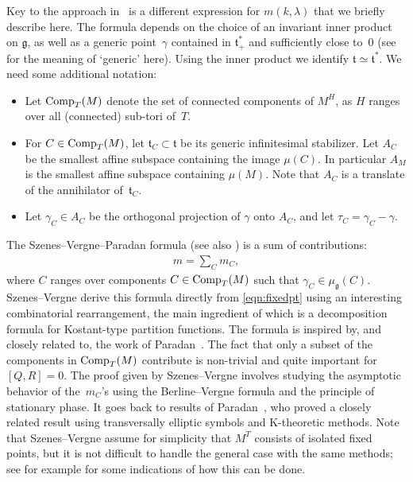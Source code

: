 \documentclass[11pt]{article}
\numberwithin{equation}{section}
\newcommand{\tn}[1]{\textnormal{#1}}
\def\g{\ensuremath{\mathfrak{g}}}
\def\t{\ensuremath{\mathfrak{t}}}
\begin{document}
Key to the approach in~\cite{SzenesVergne2010} is a different expression for $m(k,\lambda)$ that we briefly describe here. The formula depends on the choice of an invariant inner product on $\g$, as well as a generic point~$\gamma$ contained in $\t^\ast_+$ and sufficiently close to~$0$ (see~\cite[Section~4.1]{SzenesVergne2010} for the meaning of `generic' here). Using the inner product we identify $\t \simeq \t^\ast$. We need some additional notation:
\begin{itemize}\itemsep=0pt
\item Let $\tn{Comp}_T(M)$ denote the set of connected components of $M^H$, as $H$ ranges over all (connected) sub-tori of~$T$.
\item For $C \in \tn{Comp}_T(M)$, let $\t_C \subset \t$ be its generic infinitesimal stabilizer. Let $A_C$ be the smallest affine subspace containing the image $\mu(C)$. In particular $A_M$ is the smallest affine subspace containing $\mu(M)$. Note that $A_C$ is a translate of the annihilator of~$\t_C$.
\item Let $\gamma_C \in A_C$ be the orthogonal projection of $\gamma$ onto $A_C$, and let $\tau_C=\gamma_C-\gamma$.
\end{itemize}

The Szenes--Vergne--Paradan formula \cite[equation~(39)]{SzenesVergne2010} (see also \cite[Proposition~41, Theorem~48]{SzenesVergne2010}) is a sum of contributions:
\begin{gather}\label{eqn:SzVer}
m=\sum_C m_C,
\end{gather}
where $C$ ranges over components $C \in \tn{Comp}_T(M)$ such that $\gamma_C \in \mu_\g(C)$. Szenes--Vergne derive this formula directly from \eqref{eqn:fixedpt} using an interesting combinatorial rearrangement, the main ingredient of which is a decomposition formula for Kostant-type partition functions. The formula is inspired by, and closely related to, the work of Paradan~\cite{ParadanRiemannRoch}. The fact that only a subset of the components in $\tn{Comp}_T(M)$ contribute is non-trivial and quite important for $[Q,R]=0$. The proof given by Szenes--Vergne involves studying the asymptotic behavior of the~$m_C$'s using the Berline--Vergne formula and the principle of stationary phase. It goes back to results of Paradan~\cite{ParadanRiemannRoch}, who proved a closely related result using transversally elliptic symbols and K-theoretic methods. Note that Szenes--Vergne assume for simplicity that $M^T$ consists of isolated fixed points, but it is not difficult to handle the general case with the same methods; see for example \cite[Section~7]{VerlindeSums} for some indications of how this can be done.
\end{document}
